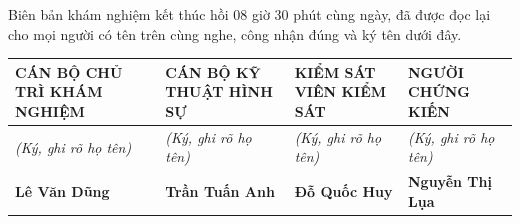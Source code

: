 \documentclass[12pt,a4paper]{article}
\begin{document}
Biên bản khám nghiệm kết thúc hồi 08 giờ 30 phút cùng ngày, đã được đọc lại cho mọi người có tên trên cùng nghe, công nhận đúng và ký tên dưới đây.




\vspace{0.6cm}
\noindent
\begin{tabularx}{\textwidth}{YYYY}
\toprule
\textbf{CÁN BỘ CHỦ TRÌ KHÁM NGHIỆM} & \textbf{CÁN BỘ KỸ THUẬT HÌNH SỰ} & \textbf{KIỂM SÁT VIÊN KIỂM SÁT} & \textbf{NGƯỜI CHỨNG KIẾN} \\
\midrule
\textit{(Ký, ghi rõ họ tên)} & \textit{(Ký, ghi rõ họ tên)} & \textit{(Ký, ghi rõ họ tên)} & \textit{(Ký, ghi rõ họ tên)} \\[1.5cm]
\textbf{Lê Văn Dũng} & \textbf{Trần Tuấn Anh} & \textbf{Đỗ Quốc Huy} & \textbf{Nguyễn Thị Lụa} \\
\bottomrule
\end{tabularx}
\end{document}
